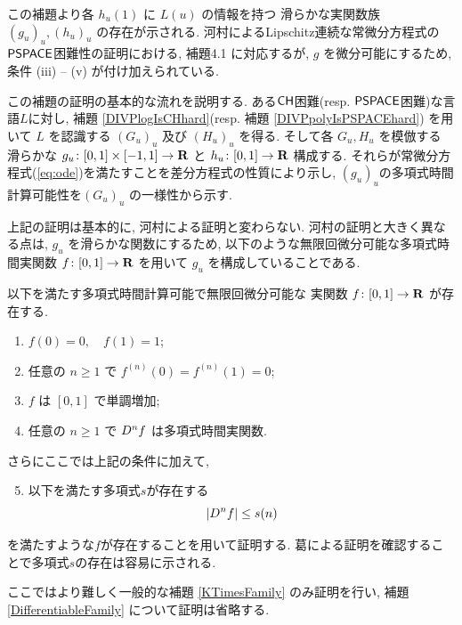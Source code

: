  この補題より各 $h_u(1)$ に $L(u)$ の情報を持つ
 滑らかな実関数族 $(g_u)_u, (h_u)_u$ の存在が示される.
 河村によるLipschitz連続な常微分方程式の$\mathsf{PSPACE}$困難性の証明における,
 補題4.1 に対応するが,
 $g$ を微分可能にするため, 条件 (iii) -- (v) が付け加えられている.


 この補題の証明の基本的な流れを説明する.
 ある$\mathsf{CH}$困難(resp. $\mathsf{PSPACE}$困難)な言語$L$に対し, 
 補題 \ref{DIVPlogIsCHhard}(resp. 補題 \ref{DIVPpolyIsPSPACEhard})
 を用いて $L$ を認識する $(G_u)_u$ 
 及び $(H_u)_u$ を得る.
 そして各 $G_u, H_u$ を模倣する
 滑らかな $g_u \colon [0,1] \times [-1, 1] \to \mathbf R$ 
 と $h_u \colon [0,1] \to \mathbf R$ 構成する.
 それらが常微分方程式(\ref{eq:ode})を満たすことを差分方程式の性質により示し,
 $(g_u)_u$の多項式時間計算可能性を$(G_u)_u$ の一様性から示す.

 上記の証明は基本的に, 河村による証明と変わらない\cite[補題4.1]{kawamura2010lipschitz}.
 河村の証明と大きく異なる点は, $g_u$ を滑らかな関数にするため, 
 以下のような無限回微分可能な多項式時間実関数 $f \colon [0,1] \to \mathbf R$ を用いて
 $g_u$ を構成していることである.

 \begin{lemma}
  \label{SmoothFunction}
  以下を満たす多項式時間計算可能で無限回微分可能な
  実関数 $f \colon [0,1] \to \mathbf R$ が存在する.

  \begin{enumerate}
   \item $f(0) = 0, \quad f(1) = 1$;
   \item 任意の $n \ge 1$ で $f^{(n)}(0) = f^{(n)}(1) = 0$;
   \item $f$ は $[0,1]$ で単調増加;
   \item 任意の $n \ge 1$ で $D^n f$ は多項式時間実関数.
  \end{enumerate}
 \end{lemma}

 さらにここでは上記の条件に加えて, 
 \begin{enumerate}
  \setcounter{enumi}{4} 
  \item 以下を満たす多項式$s$が存在する
	\begin{equation} \label{enum:polynomial-size}
	 |D^n f| \le s(n)
	\end{equation}
 \end{enumerate}
 を満たすような$f$が存在することを用いて証明する.
 葛による証明を確認することで多項式$s$の存在は容易に示される.

 ここではより難しく一般的な補題 \ref{KTimesFamily} のみ証明を行い,
 補題 \ref{DifferentiableFamily} について証明は省略する.


